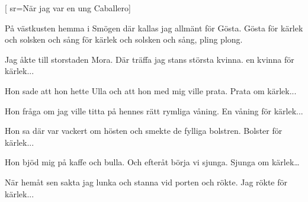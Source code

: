 


[	%
	sr={När jag var en ung Caballero}]	%
	
\beginverse*		%
På västkusten hemma i Smögen 
där kallas jag allmänt för Gösta. 
Gösta för kärlek och solsken och sång 
för kärlek och solsken och sång, 
pling plong. 
\endverse			%

\beginverse*		%
Jag åkte till storstaden Mora. 
Där träffa jag stans största kvinna. 
en kvinna för kärlek... 
\endverse			%

\beginverse*		%
Hon sade att hon hette Ulla 
och att hon med mig ville prata. 
Prata om kärlek... 
\endverse			%

\beginverse*		%
Hon fråga om jag ville titta 
på hennes rätt rymliga våning. 
En våning för kärlek... 
\endverse			%

\beginverse*		%
Hon sa där var vackert om hösten 
och smekte de fylliga bolstren. 
Bolster för kärlek...
\endverse			%

\beginverse*		%
Hon bjöd mig på kaffe och bulla.
Och efteråt börja vi sjunga.
Sjunga om kärlek… 
\endverse			%

\beginverse*		%
När hemåt sen sakta jag lunka 
och stanna vid porten och rökte. 
Jag rökte för kärlek...
\endverse			%
\endsong			%
